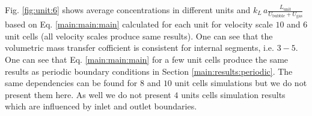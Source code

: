 \documentclass{article}
\newcommand{\beqal}{\begin{equation}\begin{aligned}}
\newcommand{\feqal}{\end{aligned}\end{equation}}
\newcommand{\vol}{k_L\,a}
\newcommand{\lunit}{L_{\mathrm{unit}}}
\newcommand{\ububble}{U_{\mathrm{bubble}}}
\newcommand{\uliq}{U_{\mathrm{liq}}}
\newcommand{\ugas}{U_{\mathrm{gas}}}
\newcommand{\volnondim}{\vol \frac{\lunit}{\ububble+\ugas}}
\begin{document}
Fig. \ref{fig:unit:6} shows average concentrations in different units and $\volnondim$ based on Eq.
\ref{main:main:main} calculated for each unit for velocity
scale $10$ and  $6$ unit cells (all velocity scales produce same results). One can see that the
volumetric mass transfer cofficient is consistent for internal segments, i.e. $3-5$. One can see
that Eq. \ref{main:main:main} for a few unit cells produce the same results as periodic boundary
conditions in Section \ref{main:results:periodic}. The same dependencies
can be found for
$8$ and $10$ unit cells simulations but we do not present them here. As well we do not present $4$
units cells simulation results which are influenced by inlet and outlet boundaries. 
\end{document}
